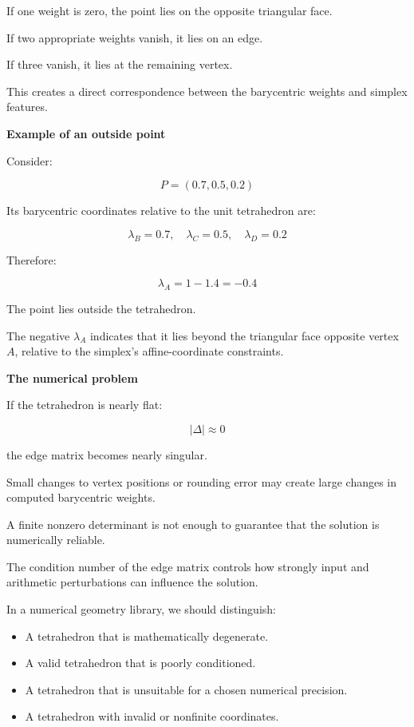 If one weight is zero, the point lies on the opposite triangular face.

If two appropriate weights vanish, it lies on an edge.

If three vanish, it lies at the remaining vertex.

This creates a direct correspondence between the barycentric weights and simplex features.

\textbf{Example of an outside point}

Consider:

\[
P=(0.7,0.5,0.2)
\]

Its barycentric coordinates relative to the unit tetrahedron are:

\[
\lambda_B=0.7,\quad\lambda_C=0.5,\quad\lambda_D=0.2
\]

Therefore:

\[
\lambda_A=1-1.4=-0.4
\]

The point lies outside the tetrahedron.

The negative \(\lambda_A\) indicates that it lies beyond the triangular face opposite vertex \(A\), relative to the simplex's affine-coordinate constraints.

\textbf{The numerical problem}

If the tetrahedron is nearly flat:

\[
|\Delta|\approx0
\]

the edge matrix becomes nearly singular.

Small changes to vertex positions or rounding error may create large changes in computed barycentric weights.

A finite nonzero determinant is not enough to guarantee that the solution is numerically reliable.

The condition number of the edge matrix controls how strongly input and arithmetic perturbations can influence the solution.

In a numerical geometry library, we should distinguish:

\begin{itemize}
\tightlist
\item
  A tetrahedron that is mathematically degenerate.
\item
  A valid tetrahedron that is poorly conditioned.
\item
  A tetrahedron that is unsuitable for a chosen numerical precision.
\item
  A tetrahedron with invalid or nonfinite coordinates.
\end{itemize}

